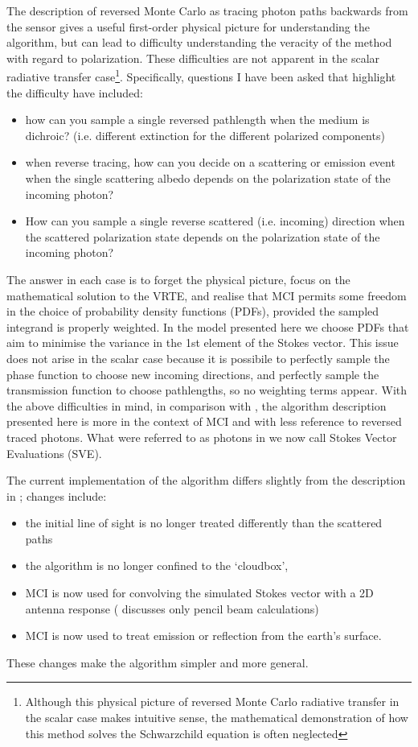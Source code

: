 The description of reversed Monte Carlo as tracing photon paths backwards from the sensor gives a useful first-order physical picture for understanding the algorithm, but can lead to difficulty understanding the veracity of the method with regard to polarization.  These difficulties are not apparent in the scalar radiative transfer case\footnote{Although this physical picture of reversed Monte Carlo radiative transfer in the scalar case makes intuitive sense, the mathematical demonstration of how this method solves the Schwarzchild equation is often neglected}. Specifically, questions I have been asked that highlight the difficulty have included:
\begin{itemize}
\item how can you sample a single reversed pathlength when the medium is dichroic? (i.e. different extinction for the different polarized components)
\item when reverse tracing, how can you decide on a scattering or emission event when the single scattering albedo depends on the polarization state of the incoming photon?
\item How can you sample a single reverse scattered (i.e. incoming) direction when the scattered polarization state depends on the polarization state of the incoming photon?
\end{itemize}
The answer in each case is to forget the physical picture, focus on the mathematical solution to the VRTE, and realise that MCI permits some freedom in the choice of probability density functions (PDFs), provided the sampled integrand is properly weighted.   In the model presented here we choose PDFs that aim to minimise the variance in the 1st element of the Stokes vector.  This issue does not arise in the scalar case because it is possibile to perfectly sample the phase function to choose new incoming directions, and perfectly sample the transmission function to choose pathlengths, so no weighting terms appear. With the above difficulties in mind, in comparison with \citep{davisetal:04}, the algorithm description presented here is more in the context of MCI and with less reference to reversed traced photons.  What were referred to as photons in \citep{davisetal:04} we now call Stokes Vector Evaluations (SVE).

The current implementation of the algorithm differs slightly from the description in \citep{davisetal:04}; changes include:
\begin{itemize}
\item the initial line of sight is no longer treated differently than the scattered paths 
\item the algorithm is no longer confined to the `cloudbox', 
\item MCI is now used for convolving the simulated Stokes vector with a 2D antenna response (\citep{davisetal:04} discusses only pencil beam calculations)
\item MCI is now used to treat emission or reflection from the earth's surface.
\end{itemize}
These changes make the algorithm simpler and more general.



